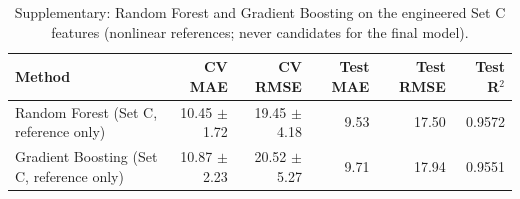 \begin{table}[t]
\centering
\small
\caption{Supplementary: Random Forest and Gradient Boosting on the engineered Set C features (nonlinear references; never candidates for the final model).}
\label{tab:table_S10_nonlinear_reference_on_set_c}
\begin{tabular}{lrrrrr}
\toprule
Method & CV MAE & CV RMSE & Test MAE & Test RMSE & Test R$^2$ \\
\midrule
Random Forest (Set C, reference only) & 10.45 $\pm$ 1.72 & 19.45 $\pm$ 4.18 & 9.53 & 17.50 & 0.9572 \\
Gradient Boosting (Set C, reference only) & 10.87 $\pm$ 2.23 & 20.52 $\pm$ 5.27 & 9.71 & 17.94 & 0.9551 \\
\bottomrule
\end{tabular}
\end{table}
